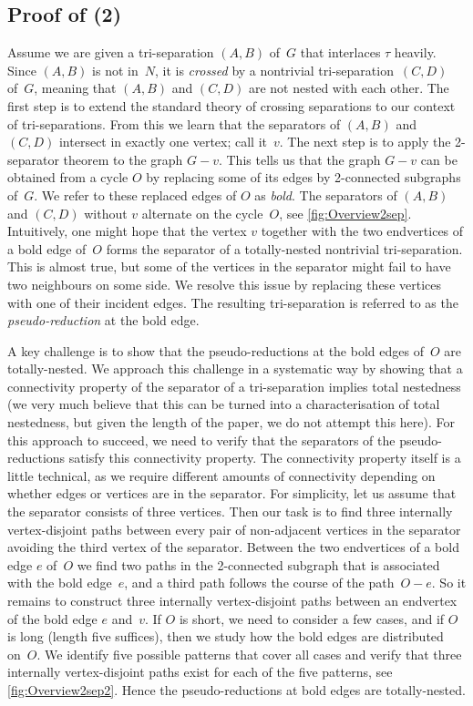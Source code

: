 \documentclass{aic}
\theoremstyle{plain}
\theoremstyle{definition}
\theoremstyle{plain}
\theoremstyle{plain}
\begin{document}
\subsection*{Proof of (2)} 
Assume we are given a tri-separation $(A,B)$ of~$G$ that interlaces $\tau$ heavily. 
Since $(A,B)$ is not in~$N$, it is \emph{crossed} by a nontrivial tri-separation~$(C,D)$ of~$G$, meaning that $(A,B)$ and $(C,D)$ are not nested with each other. 
The first step is to extend the standard theory of crossing separations to our context of tri-separations.
From this we learn that the separators of $(A,B)$ and $(C,D)$ intersect in exactly one vertex; call it~$v$. 
The next step is to apply the 2-separator theorem to the graph $G-v$. 
This tells us that the graph $G-v$ can be obtained from a cycle $O$ by replacing some of its edges by 2-connected subgraphs of~$G$. 
We refer to these replaced edges of $O$ as \emph{bold}. 
The separators of $(A,B)$ and $(C,D)$ without $v$ alternate on the cycle~$O$, see \autoref{fig:Overview2sep}. 
Intuitively, one might hope that the vertex $v$ together with the two endvertices of a bold edge of~$O$ forms the separator of a totally-nested nontrivial tri-separation.
This is almost true, but some of the vertices in the separator might fail to have two neighbours on some side.
We resolve this issue by replacing these vertices with one of their incident edges.
The resulting tri-separation is referred to as the \emph{pseudo-reduction} at the bold edge.

A key challenge is to show that the pseudo-reductions at the bold edges of~$O$ are totally-nested.
We approach this challenge in a systematic way by showing that a connectivity property of the separator of a tri-separation implies total nestedness (we very much believe that this can be turned into a characterisation of total nestedness, but given the length of the paper, we do not attempt this here). 
For this approach to succeed, we need to verify that the separators of the pseudo-reductions satisfy this connectivity property. 
The connectivity property itself is a little technical, as we require different amounts of connectivity depending on whether edges or vertices are in the separator. 
For simplicity, let us assume that the separator consists of three vertices. 
Then our task is to find three internally vertex-disjoint paths between every pair of non-adjacent vertices in the separator avoiding the third vertex of the separator.
Between the two endvertices of a bold edge $e$ of~$O$ we find two paths in the 2-connected subgraph that is associated with the bold edge~$e$, and a third path follows the course of the path~$O-e$.
So it remains to construct three internally vertex-disjoint paths between an endvertex of the bold edge $e$ and~$v$. 
If $O$ is short, we need to consider a few cases, and if $O$ is long (length five suffices), then we study how the bold edges are distributed on~$O$. 
We identify five possible patterns that cover all cases and verify that three internally vertex-disjoint paths exist for each of the five patterns, see \autoref{fig:Overview2sep2}. 
Hence the pseudo-reductions at bold edges are totally-nested. 
\end{document}

